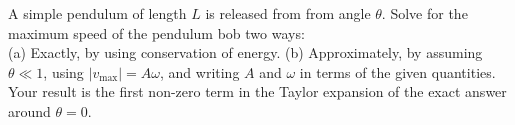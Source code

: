 A simple pendulum of length $L$ is released from from angle $\theta$.
Solve for the maximum speed of the pendulum bob two ways:\\
%
(a) Exactly, by using conservation of energy.\answercheck\hwendpart
%
(b) Approximately, by assuming $\theta \ll 1$, using $|v_\text{max}|
= A\omega$, and writing $A$ and $\omega$ in terms of the given
quantities. Your result is the first non-zero term in the Taylor
expansion of the exact answer around $\theta = 0$.\answercheck
